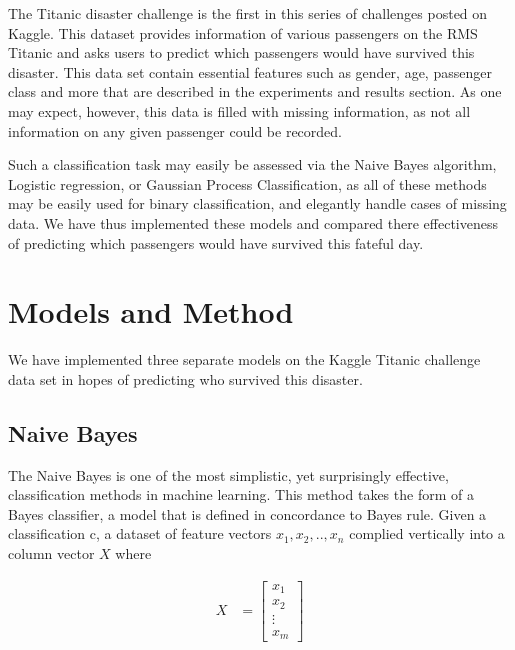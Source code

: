 \documentclass{article}
\begin{document}
The Titanic disaster challenge is the first in this series of challenges posted on Kaggle. This dataset provides information of various passengers on the RMS Titanic and asks users to predict which passengers would have survived this disaster. This data set contain essential features such as gender, age, passenger class and more that are described in the experiments and results section. As one may expect, however, this data is filled with missing information, as not all information on any given passenger could be recorded.

Such a classification task may easily be assessed via the Naive Bayes algorithm, Logistic regression, or Gaussian Process Classification, as all of these methods may be easily used for binary classification, and elegantly handle cases of missing data.
We have thus implemented these models and compared there effectiveness of predicting which passengers would have survived this fateful day. 




\section{Models and Method} 

We have implemented three separate models on the Kaggle Titanic challenge data set in hopes of predicting who survived this disaster. 
 
\subsection{Naive Bayes}

The Naive Bayes is one of the most simplistic, yet surprisingly effective, classification methods in machine learning. This method takes the form of a Bayes classifier, a model that is defined in concordance to Bayes rule. Given a classification c, a dataset of feature vectors $x_1, x_2,..,x_n$ complied vertically into a column vector $X$ where

  \begin{align}
    X &= \begin{bmatrix}
           x_{1} \\
           x_{2} \\
           \vdots \\
           x_{m}
         \end{bmatrix}
  \end{align}
  
\end{document}
